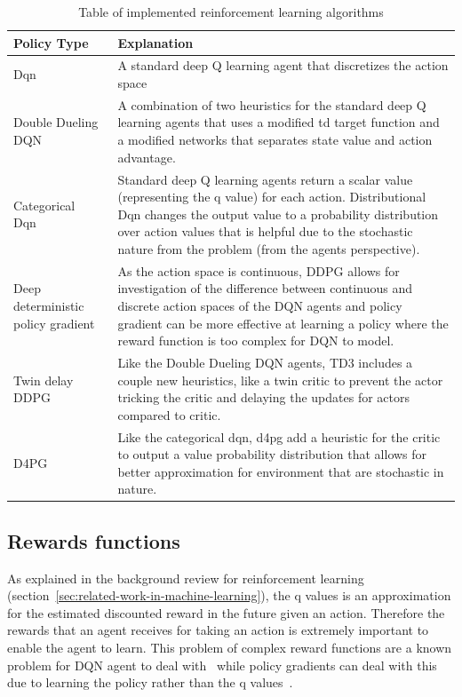 \begin{table}
    \centering
    \begin{tabular}{|p{3cm}|p{12cm}|} \hline
        Policy Type & Explanation \\ \hline
        Dqn~\citep{mnih2015humanlevel} & A standard deep Q learning agent that discretizes the action space \\ \hline
        Double Dueling DQN~\citep{doubledqn, duelingdqn} & A combination of two heuristics for the standard deep Q
            learning agents that uses a modified td target function and a modified networks that separates state value
            and action advantage. \\ \hline
        Categorical Dqn~\citep{distributional_dqn} & Standard deep Q learning agents return a scalar value
            (representing the q value) for each action. Distributional Dqn changes the output value to a probability
            distribution over action values that is helpful due to the stochastic nature from the problem (from the
            agents perspective). \\ \hline
        Deep deterministic policy gradient~\citep{ddpg} & As the action space is continuous, DDPG allows for
            investigation of the difference between continuous and discrete action spaces of the DQN agents and policy
            gradient can be more effective at learning a policy where the reward function is too complex for DQN to
            model. \\ \hline
        Twin delay DDPG~\citep{td3} & Like the Double Dueling DQN agents, TD3 includes a couple new heuristics, like a
            twin critic to prevent the actor tricking the critic and delaying the updates for actors compared to
            critic.\\ \hline
        D4PG~\citep{d4pg} & Like the categorical dqn, d4pg add a heuristic for the critic to output a value probability
            distribution that allows for better approximation for environment that are stochastic in nature. \\ \hline
    \end{tabular}
    \caption{Table of implemented reinforcement learning algorithms}
    \label{tab:reinforcement_learning_algorithms}
\end{table}

\subsection{Rewards functions}\label{subsec:rewards-functions}
As explained in the background review for reinforcement learning (section~\ref{sec:related-work-in-machine-learning}),
the q values is an approximation for the estimated discounted reward in the future given an action. Therefore the
rewards that an agent receives for taking an action is extremely important to enable the agent to learn. This problem
of complex reward functions are a known problem for DQN agent to deal with~\citep{atari} while policy gradients can
deal with this due to learning the policy rather than the q values~\citep{Sutton1998}.

